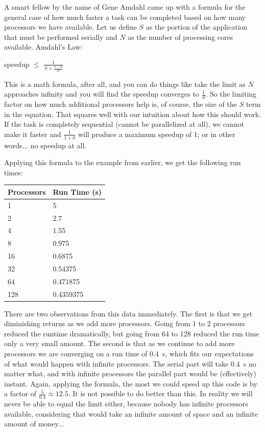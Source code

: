 A smart fellow by the name of Gene Amdahl came up with a formula for the general case of how much faster a task can be completed based on how many processors we have available. Let us define $S$ as the portion of the application that must be performed serially and $N$ as the number of processing cores available. Amdahl's Law:

\begin{center}
	speedup $\leq$ {\huge $\frac{1}{S + \frac{1-S}{N}}$}
\end{center}

This is a math formula, after all, and you can do things like take the limit as $N$ approaches infinity and you will find the speedup converges to $\frac{1}{S}$. So the limiting factor on how much additional processors help is, of course, the size of the $S$ term in the equation. That squares well with our intuition about how this should work. If the task is completely sequential (cannot be parallelized at all), we cannot make it faster and $\frac{1}{1 + 0}$ will produce a maximum speedup of 1; or in other words... no speedup at all.

Applying this formula to the example from earlier, we get the following run times:

\begin{center}
	\begin{tabular}{l|l}
		\textbf{Processors} & \textbf{Run Time (s)} \\ \hline
		1                   & 5                     \\
		2                   & 2.7                   \\
		4                   & 1.55                  \\
		8                   & 0.975                 \\
		16                  & 0.6875                \\
		32                  & 0.54375               \\
		64                  & 0.471875              \\
		128                 & 0.4359375             \\
	\end{tabular}
\end{center}

There are two observations from this data immediately. The first is that we get diminishing returns as we add more processors. Going from 1 to 2 processors reduced the runtime dramatically, but going from 64 to 128 reduced the run time only a very small amount. The second is that as we continue to add more processors we are converging on a run time of 0.4~s, which fits our expectations of what would happen with infinite processors. The serial part will take 0.4~s no matter what, and with infinite processors the parallel part would be (effectively) instant. Again, applying the formula, the most we could speed up this code is by a factor of $\frac{5}{0.4}\approx 12.5$. It is not possible to do better than this. In reality we will never be able to equal the limit either, because nobody has infinite processors available, considering that would take an infinite amount of space and an infinite amount of money...

